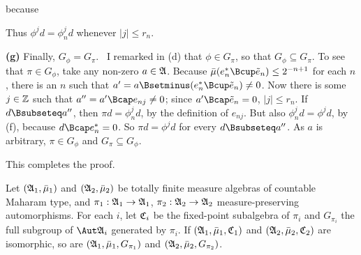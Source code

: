 {\noindent because
     
     
\noindent Thus $\phi^jd=\phi_n^jd$ whenever $|j|\le r_n$.
     
\medskip
     
{\bf (g)} Finally, $G_{\phi}=G_{\pi}$.   \Prf\ I remarked in (d) that
$\phi\in G_{\pi}$, so that $G_{\phi}\subseteq G_{\pi}$.   To see that
$\pi\in G_{\phi}$, take any non-zero $a\in\frak A$.   Because
$\bar\mu(e^*_n\Bcup\tilde e_n)\le 2^{-n+1}$ for each $n$, there is an
$n$ such that $a'=a\Bsetminus(e^*_n\Bcup\tilde e_n)\ne 0$.  Now there is
some $j\in\Bbb Z$ such that
$a''=a'\Bcap e_{nj}\ne 0$;  since $a'\Bcap\tilde e_n=0$, $|j|\le r_n$.
If $d\Bsubseteq a''$, then $\pi d=\phi_n^jd$, by the definition of
$e_{nj}$.   But also $\phi_n^jd=\phi^jd$, by (f), because
$d\Bcap e_n^*=0$.   So $\pi d=\phi^jd$ for every $d\Bsubseteq a''$.
As $a$ is arbitrary, $\pi\in G_{\phi}$ and
$G_{\pi}\subseteq G_{\phi}$.\ \Qed
     
This completes the proof.
}%
     
Let $(\frak A_1,\bar\mu_1)$ and
$(\frak A_2, \bar\mu_2)$ be totally finite measure algebras of countable
Maharam type, and $\pi_1:\frak A_1 \to\frak A_1$,
$\pi_2:\frak A_2\to\frak A_2$ measure-preserving
automorphisms.   For each $i$, let $\frak C_i$ be the fixed-point
subalgebra of $\pi_i$ and $G_{\pi_i}$ the full subgroup of
$\Aut\frak A_i$ generated by $\pi_i$.   If
$(\frak A_1,\bar\mu_1,\frak C_1)$ and $(\frak A_2,\bar\mu_2,\frak C_2)$
are isomorphic, so are $(\frak A_1,\bar\mu_1,G_{\pi_1})$ and
$(\frak A_2,\bar\mu_2,G_{\pi_2})$.
     
